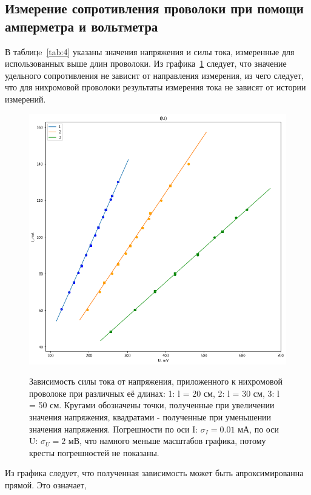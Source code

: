 \documentclass{article}
\begin{document}
\subsection{Измерение сопротивления проволоки при помощи амперметра и вольтметра}
В таблицe~\ref{tab:4} указаны значения напряжения и силы тока, измеренные для использованных выше длин проволоки. 
Из графика~\ref{fig:2} следует, что значение удельного сопротивления не зависит от направления измерения, из чего следует, 
что для нихромовой проволоки результаты измерения тока не зависят от истории измерений.
\begin{figure}[H]
    \label{fig:2}
    \begin{center}
        \includegraphics[width=\textwidth]{gr2} \\
    \end{center}
    \caption{Зависимость силы тока от напряжения, приложенного к нихромовой проволоке при различных её длинах: 
    1: l = 20 см, 2: l = 30 см, 3: l = 50 см.
    Кругами обозначены точки, полученные при увеличении значения напряжения, квадратами - полученные при уменьшении значения напряжения.
    Погрешности по оси I: $\sigma_I = 0.01 \textrm{ мА}$, по оси U: $\sigma_U = 2 \textrm{ мВ}$, что намного меньше масштабов графика, 
    потому кресты погрешностей не показаны.}
\end{figure}
Из графика следует, что полученная зависимость может быть апроксимированна прямой. Это означает, 
\end{document}

